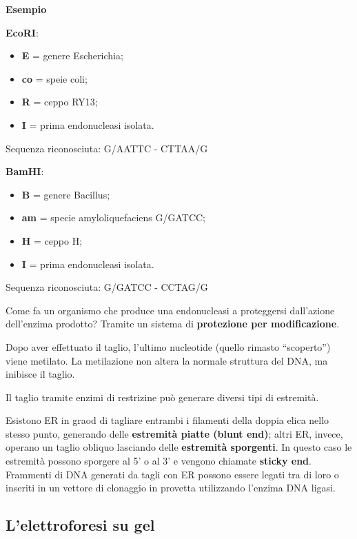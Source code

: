 \documentclass[]{article}
\begin{document}
\textbf{Esempio}

\textbf{EcoRI}:

\begin{itemize}
\itemsep1pt\parskip0pt
\item
  \textbf{E} = genere Escherichia;
\item
  \textbf{co} = speie coli;
\item
  \textbf{R} = ceppo RY13;
\item
  \textbf{I} = prima endonucleasi isolata.
\end{itemize}

Sequenza riconosciuta: G/AATTC - CTTAA/G

\textbf{BamHI}:

\begin{itemize}
\itemsep1pt\parskip0pt
\item
  \textbf{B} = genere Bacillus;
\item
  \textbf{am} = specie amyloliquefaciens G/GATCC;
\item
  \textbf{H} = ceppo H;
\item
  \textbf{I} = prima endonucleasi isolata.
\end{itemize}

Sequenza riconosciuta: G/GATCC - CCTAG/G

Come fa un organismo che produce una endonucleasi a proteggersi
dall'azione dell'enzima prodotto? Tramite un sistema di
\textbf{protezione per modificazione}.

Dopo aver effettuato il taglio, l'ultimo nucleotide (quello rimasto
``scoperto'') viene metilato. La metilazione non altera la normale
struttura del DNA, ma inibisce il taglio.

Il taglio tramite enzimi di restrizine può generare diversi tipi di
estremità.

Esistono ER in graod di tagliare entrambi i filamenti della doppia elica
nello stesso punto, generando delle \textbf{estremità piatte (blunt
end)}; altri ER, invece, operano un taglio obliquo lasciando delle
\textbf{estremità sporgenti}. In questo caso le estremità possono
sporgere al 5' o al 3' e vengono chiamate \textbf{sticky end}. Frammenti
di DNA generati da tagli con ER possono essere legati tra di loro o
inseriti in un vettore di clonaggio in provetta utilizzando l'enzima DNA
ligasi.

\subsection{L'elettroforesi su gel}\label{lelettroforesi-su-gel}
\end{document}
